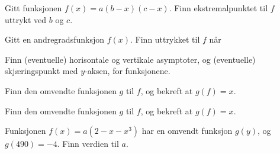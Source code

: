 





\opgt

\nes
{}
Gitt funksjonen 
$ f(x)=a(b-x)(c-x) $. Finn ekstremalpunktet til $ f $ uttrykt ved $ b $ og $ c $. 

Gitt en andregradsfunksjon $ f(x) $. Finn uttrykket til $ f $ når
 \vs

\nes
{}
Finn (eventuelle) horisontale og vertikale asymptoter, og (eventuelle) skjæringspunkt med $ y $-aksen, for funksjonene. \os
{} \os
{}

\nes
{}
Finn den omvendte funksjonen $ g $ til $ f $, og bekreft at $ g(f)=x $. \os
{} \os
{}

Finn den omvendte funksjonen $ g $ til $ f $, og bekreft at $ g(f)=x $. \os
{}



Funksjonen $ f(x)=a(2-x-x^3) $ har en omvendt funksjon $ g(y) $, og $ g(490)= -4$. Finn verdien til $ a $.

